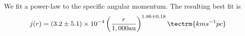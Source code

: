 We fit a power-law to the specific angular momentum. 
The resulting best fit is 
\begin{equation}
j(r) = (3.2\pm5.1)\times 10^{-4}\left( \frac{r}{1,000 \textrm{au}}\right)^{1.86\pm0.18} \tectrm{km s^{-1} pc}
\end{equation}
  